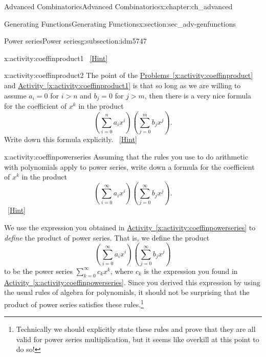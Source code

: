\documentclass[oneside,10pt,]{book}
\numberwithin{equation}{chapter}
\begin{document}
\begin{chapterptx}{Advanced Combinatorics}{}{Advanced Combinatorics}{}{}{x:chapter:ch_advanced}
\begin{sectionptx}{Generating Functions}{}{Generating Functions}{}{}{x:section:sec_adv-genfunctions}
\begin{subsectionptx}{Power series}{}{Power series}{}{}{g:subsection:idm5747}
\begin{activity}{}{x:activity:coeffinproduct1}
\qquad~\hfill{\tiny\hyperlink{g:hint:idm5780-back}{[Hint]}}\end{activity}
\begin{activity}{}{x:activity:coeffinproduct2}%
The point of the \hyperref[x:activity:coeffinproduct]{Problems~\ref{x:activity:coeffinproduct}} and \hyperref[x:activity:coeffinproduct1]{Activity~\ref{x:activity:coeffinproduct1}} is that so long as we are willing to assume \(a_i=0\) for \(i>n\) and \(b_j =0\) for \(j>m\), then there is a very nice formula for the coefficient of \(x^k\) in the product%
\begin{equation*}
\left(\sum_{i=0}^n a_ix^i\right)\left(\sum_{j=0}^m b_jx^j\right).
\end{equation*}
Write down this formula explicitly.%
\qquad~\hfill{\tiny\hyperlink{g:hint:idm5823-back}{[Hint]}}\end{activity}
\begin{activity}{}{x:activity:coeffinpowerseries}%
Assuming that the rules you use to do arithmetic with polynomials apply to power series, write down a formula for the coefficient of \(x^k\) in the product%
\begin{equation*}
\left(\sum_{i=0}^\infty a_ix^i\right)\left(\sum_{j=0}^\infty
b_jx^j\right)\text{.}
\end{equation*}
%
\qquad~\hfill{\tiny\hyperlink{g:hint:idm5838-back}{[Hint]}}\end{activity}
We use the expression you obtained in \hyperref[x:activity:coeffinpowerseries]{Activity~\ref{x:activity:coeffinpowerseries}} to \emph{define} the product of power series. That is, we define the product%
\begin{equation*}
\left(\sum_{i=0}^\infty a_ix^i\right)\left(\sum_{j=0}^\infty
b_jx^j\right)
\end{equation*}
to be the power series \(\sum_{k=0}^\infty c_k x^k\), where \(c_k\) is the expression you found in \hyperref[x:activity:coeffinpowerseries]{Activity~\ref{x:activity:coeffinpowerseries}}. Since you derived this expression by using the usual rules of algebra for polynomials, it should not be surprising that the product of power series satisfies these rules.\footnote{Technically we should explicitly state these rules and prove that they are all valid for power series multiplication, but it seems like overkill at this point to do so!\label{g:fn:idm5852}}%
\end{subsectionptx}
%
%
\typeout{************************************************}
\typeout{************************************************}

\end{sectionptx}
\end{chapterptx}
\end{document}
